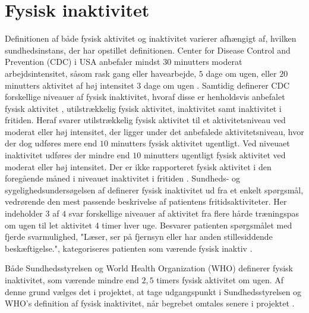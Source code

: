 \section{Fysisk inaktivitet}

Definitionen af både fysisk aktivitet og inaktivitet varierer afhængigt af, hvilken sundhedsinstans, der har opstillet definitionen. Center for Disease Control and Prevention (CDC) i USA anbefaler mindst $30$ minutters moderat arbejdsintensitet, såsom rask gang eller havearbejde, $5$ dage om ugen, eller $20$ minutters aktivitet af høj intensitet $3$ dage om ugen \citep{motionsraad2007,christensen2012}.
Samtidig definerer CDC forskellige niveauer af fysisk inaktivitet, hvoraf disse er henholdsvis anbefalet fysisk aktivitet , utilstrækkelig fysisk aktivitet, inaktivitet samt inaktivitet i fritiden. Heraf svarer utilstrækkelig fysisk aktivitet til et aktivitetsniveau ved moderat eller høj intensitet, der ligger under det anbefalede aktivitetsniveau, hvor der dog udføres mere end $10$ minutters fysisk aktivitet ugentligt. Ved niveuaet inaktivitet udføres der mindre end $10$ minutters ugentligt fysisk aktivitet ved moderat eller høj intensitet. Der er ikke rapporteret fysisk aktivitet i den foregående måned i niveauet inaktivitet i fritiden \citep{motionsraad2007,christensen2012}.
Sundheds- og sygelighedsundersøgelsen af \citeauthor{christensen2012} definerer fysisk inaktivitet ud fra et enkelt spørgsmål, vedrørende den mest passende beskrivelse af patientens fritidsaktiviteter. Her indeholder $3$ af $4$ svar forskellige niveauer af aktivitet fra flere hårde træningspas om ugen til let aktivitet 4 timer hver uge. Besvarer patienten spørgsmålet med fjerde svarmulighed, "Læser, ser på fjernsyn eller har anden stillesiddende beskæftigelse.", kategoriseres patienten som værende fysisk inaktiv \citep{motionsraad2007,christensen2012}.

Både Sundhedsstyrelsen og World Health Organization (WHO) definerer fysisk inaktivitet, som værende mindre end $2,5$ timers fysisk aktivitet om ugen. Af denne grund vælges det i projektet, at tage udgangspunkt i Sundhedsstyrelsen og WHO's definition af fysisk inaktivitet, når begrebet omtales senere i projektet \citep{motionsraad2007}.